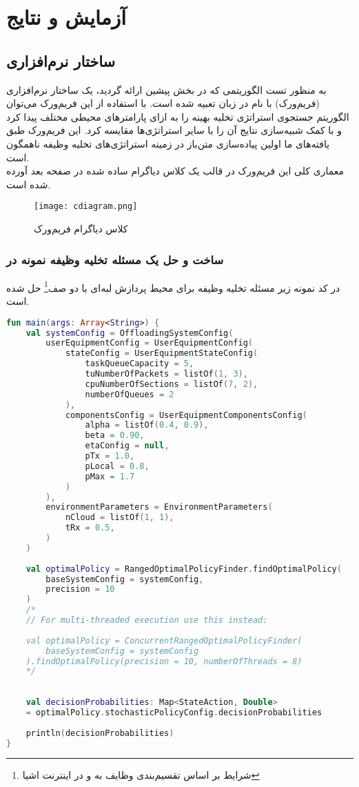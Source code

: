 \chapter{آزمایش و نتایج}
\section{ساختار نرم‌افزاری }
به منظور تست الگوریتمی که در بخش پیشین ارائه گردید، یک ساختار نرم‌افزاری (فریم‌ورک) با نام  در زبان  تعبیه شده است. با استفاده از این فریم‌ورک می‌توان الگوریتم جستجوی استراتژی تخلیه بهینه را به ازای پارامترهای محیطی مختلف پیدا کرد و با کمک شبیه‌سازی نتایج آن را با سایر استراتژی‌ها مقایسه کرد. این فریم‌ورک طبق یافته‌های ما اولین پیاده‌سازی متن‌باز در زمینه استراتژی‌های تخلیه وظیفه ناهمگون است. \\
معماری کلی این فریم‌ورک در قالب یک کلاس دیاگرام ساده شده در صفحه بعد آورده شده است.
\newpage
\begin{figure}[H]
	\texttt{[image: cdiagram.png]}
	\caption{کلاس دیاگرام فریم‌ورک }
\end{figure}
\newpage
\subsection{ساخت و حل یک مسئله تخلیه وظیفه نمونه در }
در کد نمونه زیر مسئله تخلیه وظیفه‌ برای محیط پردازش لبه‌ای با دو صف\footnote{شرایط بر اساس تقسیم‌بندی وظایف به  و  در اینترنت اشیا} حل شده است.
\begin{latin}
\begin{lstlisting}[language=Kotlin]
fun main(args: Array<String>) {
	val systemConfig = OffloadingSystemConfig(
		userEquipmentConfig = UserEquipmentConfig(
			stateConfig = UserEquipmentStateConfig(
				taskQueueCapacity = 5,
				tuNumberOfPackets = listOf(1, 3),
				cpuNumberOfSections = listOf(7, 2),
				numberOfQueues = 2
			),
			componentsConfig = UserEquipmentComponentsConfig(
				alpha = listOf(0.4, 0.9),
				beta = 0.90,
				etaConfig = null,
				pTx = 1.0,
				pLocal = 0.8,
				pMax = 1.7
			)
		),
		environmentParameters = EnvironmentParameters(
			nCloud = listOf(1, 1),
			tRx = 0.5,
		)
	)
	
	val optimalPolicy = RangedOptimalPolicyFinder.findOptimalPolicy(
		baseSystemConfig = systemConfig, 
		precision = 10
	)
	/*
	// For multi-threaded execution use this instead:
	
	val optimalPolicy = ConcurrentRangedOptimalPolicyFinder(
		baseSystemConfig = systemConfig
	).findOptimalPolicy(precision = 10, numberOfThreads = 8)
	*/
	
	
	val decisionProbabilities: Map<StateAction, Double>
	= optimalPolicy.stochasticPolicyConfig.decisionProbabilities
	
	println(decisionProbabilities)
}
\end{lstlisting}
\end{latin}
\newpage
